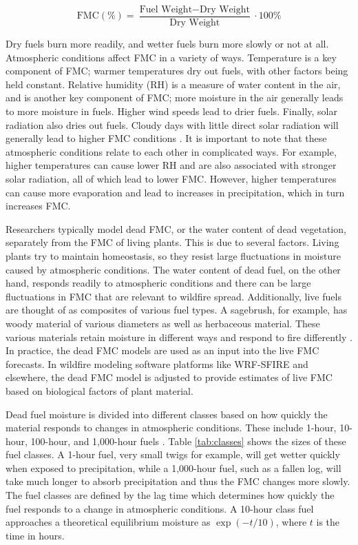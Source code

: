 \documentclass[11pt]{article}%
\begin{document}
\begin{equation}
    \text{FMC} (\%) = \frac{\text{Fuel Weight} - \text{Dry Weight}}{\text{Dry Weight}} \cdot 100\%
\end{equation}

Dry fuels burn more readily, and wetter fuels burn more slowly or not at all. Atmospheric conditions affect FMC in a variety of ways. Temperature is a key component of FMC; warmer temperatures dry out fuels, with other factors being held constant. Relative humidity (RH) is a measure of water content in the air, and is another key component of FMC; more moisture in the air generally leads to more moisture in fuels. Higher wind speeds lead to drier fuels. Finally, solar radiation also dries out fuels. Cloudy days with little direct solar radiation will generally lead to higher FMC conditions \citep{NWCG-2024-FWP}. It is important to note that these atmospheric conditions relate to each other in complicated ways. For example, higher temperatures can cause lower RH and are also associated with stronger solar radiation, all of which lead to lower FMC. However, higher temperatures can cause more evaporation and lead to increases in precipitation, which in turn increases FMC.

Researchers typically model dead FMC, or the water content of dead vegetation, separately from the FMC of living plants. This is due to several factors. Living plants try to maintain homeostasis, so they resist large fluctuations in moisture caused by atmospheric conditions. The water content of dead fuel, on the other hand, responds readily to atmospheric conditions and there can be large fluctuations in FMC that are relevant to wildfire spread. Additionally, live fuels are thought of as composites of various fuel types. A sagebrush, for example, has woody material of various diameters as well as herbaceous material. These various materials retain moisture in different ways and respond to fire differently \citep{NWCG-2024-FWP}. In practice, the dead FMC models are used as an input into the live FMC forecasts. In wildfire modeling software platforms like WRF-SFIRE and elsewhere, the dead FMC model is adjusted to provide estimates of live FMC based on biological factors of plant material.

Dead fuel moisture is divided into different classes based on how quickly the material responds to changes in atmospheric conditions. These include 1-hour, 10-hour, 100-hour, and 1,000-hour fuels \citep{NCEI-2024-DFM}. Table \ref{tab:classes} shows the sizes of these fuel classes. A 1-hour fuel, very small twigs for example, will get wetter quickly when exposed to precipitation, while a 1,000-hour fuel, such as a fallen log, will take much longer to absorb precipitation and thus the FMC changes more slowly. The fuel classes are defined by the lag time which determines how quickly the fuel responds to a change in atmospheric conditions. A 10-hour class fuel approaches a theoretical equilibrium moisture as $\exp(-t/10)$, where $t$ is the time in hours.
\end{document}
